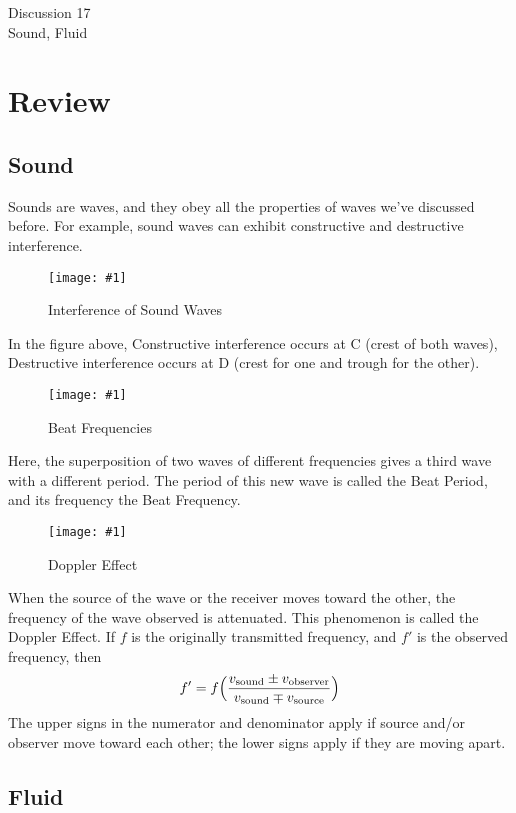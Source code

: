 \documentclass[11pt]{article}
\newcommand{\fig}[4]{
    \begin{figure}[H]
        \centering
        \texttt{[image: \#1]}
        \caption{#2}
        \label{exp4fit}
    \end{figure}
}
\theoremstyle{gangnamstyle}{\newtheorem{definition}{Definition}[]}
\theoremstyle{gangnamstyle}{\newtheorem{example}{Example}[]}
\theoremstyle{gangnamstyle}{\newtheorem{problem}{Problem}[]}
\begin{document}
\normalfont
\pagestyle{pages}


\begin{center}
\vspace{3in}
{\Large Discussion 17 } \\ [0.05in]
Sound, Fluid \\ [-0.5in]
\end{center}

\section{Review}

\subsection{Sound}

Sounds are waves, and they obey all the properties of waves we've discussed before. For example, sound waves can exhibit constructive and destructive interference.

\fig{figs/0801/sound.png}{Interference of Sound Waves}{0.4}{0}

In the figure above, Constructive interference occurs at C (crest of both waves), Destructive interference occurs at D (crest for one and trough for the other).

\fig{figs/0801/beat.png}{Beat Frequencies}{0.45}{0}

Here, the superposition of two waves of different frequencies gives a third wave with a different period. The period of this new wave is called the Beat Period, and its frequency the Beat Frequency. 

\pagebreak

\fig{figs/0801/doppler.png}{Doppler Effect}{0.5}{0}

When the source of the wave or the receiver moves toward the other, the frequency of the wave observed is attenuated. This phenomenon is called the Doppler Effect. If $f$ is the originally transmitted frequency, and $f'$ is the observed frequency, then
\[ f' = f\Bigl( \frac{v_{\text{sound}} \pm v_{\text{observer}}}{v_{\text{sound}} \mp v_{\text{source}}} \Bigr) \]
The upper signs in the numerator and denominator apply if source and/or observer move toward each other; the lower signs apply if they are moving apart.

\pagebreak

\subsection{Fluid}
\end{document}
